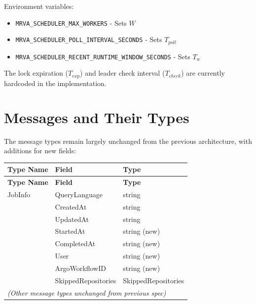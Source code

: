 \documentclass[11pt]{article}
\begin{document}
Environment variables:
\begin{itemize}
\item \texttt{MRVA\_SCHEDULER\_MAX\_WORKERS} - Sets $W$
\item \texttt{MRVA\_SCHEDULER\_POLL\_INTERVAL\_SECONDS} - Sets $T_{poll}$
\item \texttt{MRVA\_SCHEDULER\_RECENT\_RUNTIME\_WINDOW\_SECONDS} - Sets $T_w$
\end{itemize}

The lock expiration ($T_{exp}$) and leader check interval ($T_{check}$) are currently hardcoded in the implementation.

\section{Messages and Their Types}
\label{sec:msg-types}

The message types remain largely unchanged from the previous architecture, with additions for new fields:

\begin{longtable}{|p{4.5cm}|p{4.5cm}|p{5cm}|}
  \hline
  \rowcolor{gray!20} \textbf{Type Name} & \textbf{Field} & \textbf{Type} \\
  \hline
  \endfirsthead

  \hline
  \rowcolor{gray!20} \textbf{Type Name} & \textbf{Field} & \textbf{Type} \\
  \hline
  \endhead

  \hline
  \endfoot

  \hline
  \endlastfoot

  JobInfo & QueryLanguage & string \\
                                        & CreatedAt & string \\
                                        & UpdatedAt & string \\
                                        & StartedAt & string (new) \\
                                        & CompletedAt & string (new) \\
                                        & User & string (new) \\
                                        & ArgoWorkflowID & string (new) \\
                                        & SkippedRepositories & SkippedRepositories \\
  \hline

  \multicolumn{3}{l}{\textit{(Other message types unchanged from previous spec)}} \\
\end{longtable}
\end{document}
